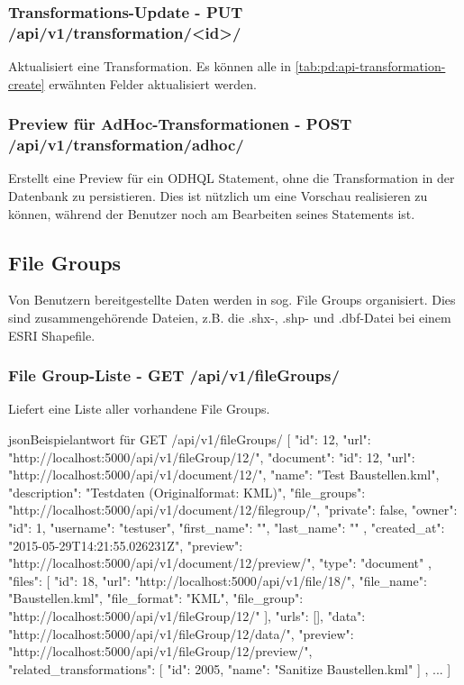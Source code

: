 \subsubsection{Transformations-Update - PUT /api/v1/transformation/<id>/}
Aktualisiert eine Transformation. Es können alle in \cref{tab:pd:api-transformation-create} erwähnten Felder aktualisiert werden.

\subsubsection{Preview für AdHoc-Transformationen - POST /api/v1/transformation/adhoc/}
Erstellt eine Preview für ein ODHQL Statement, ohne die Transformation in der Datenbank zu persistieren. Dies ist nützlich um eine Vorschau realisieren zu können, während der Benutzer noch am Bearbeiten seines Statements ist.

\subsection{File Groups}\label{sec:pd:api-filegroups}
Von Benutzern bereitgestellte Daten werden in sog. File Groups organisiert. Dies sind zusammengehörende Dateien, z.B. die .shx-, .shp- und .dbf-Datei bei einem ESRI Shapefile.

\subsubsection{File Group-Liste - GET /api/v1/fileGroups/}
Liefert eine Liste aller vorhandene File Groups.

\begin{srclst}{json}{Beispielantwort für GET /api/v1/fileGroups/}
[
    {
        "id": 12, 
        "url": "http://localhost:5000/api/v1/fileGroup/12/", 
        "document": {
            "id": 12, 
            "url": "http://localhost:5000/api/v1/document/12/", 
            "name": "Test Baustellen.kml", 
            "description": "Testdaten (Originalformat: KML)", 
            "file_groups": "http://localhost:5000/api/v1/document/12/filegroup/", 
            "private": false, 
            "owner": {
                "id": 1, 
                "username": "testuser", 
                "first_name": "", 
                "last_name": ""
            }, 
            "created_at": "2015-05-29T14:21:55.026231Z", 
            "preview": "http://localhost:5000/api/v1/document/12/preview/", 
            "type": "document"
        }, 
        "files": [
            {
                "id": 18, 
                "url": "http://localhost:5000/api/v1/file/18/", 
                "file_name": "Baustellen.kml", 
                "file_format": "KML", 
                "file_group": "http://localhost:5000/api/v1/fileGroup/12/"
            }
        ], 
        "urls": [], 
        "data": "http://localhost:5000/api/v1/fileGroup/12/data/", 
        "preview": "http://localhost:5000/api/v1/fileGroup/12/preview/", 
        "related_transformations": [
            {
                "id": 2005, 
                "name": "Sanitize Baustellen.kml"
            }
        ]
    },
    ...
]
\end{srclst}

